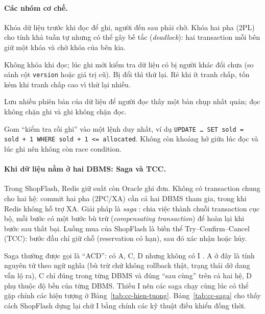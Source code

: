 \paragraph{Các nhóm cơ chế.}
\begin{description}[style=nextline, leftmargin=1.25cm]
  \item[Khóa bi quan.] Khóa dữ liệu trước khi đọc để ghi, người đến sau phải chờ. Khóa hai pha (2PL) cho tính khả tuần tự nhưng có thể gây bế tắc (\emph{deadlock}): hai transaction mỗi bên giữ một khóa và chờ khóa của bên kia.
  \item[Kiểm soát lạc quan.] Không khóa khi đọc; lúc ghi mới kiểm tra dữ liệu có bị người khác đổi chưa (so sánh cột \texttt{version} hoặc giá trị cũ). Bị đổi thì thử lại. Rẻ khi ít tranh chấp, tốn kém khi tranh chấp cao vì thử lại nhiều.
  \item[MVCC.] Lưu nhiều phiên bản của dữ liệu để người đọc thấy một bản chụp nhất quán; đọc không chặn ghi và ghi không chặn đọc.
  \item[Thao tác nguyên tử.] Gom ``kiểm tra rồi ghi'' vào một lệnh duy nhất, ví dụ \texttt{UPDATE \ldots{} SET sold = sold + 1 WHERE sold + 1 <= allocated}. Không còn khoảng hở giữa lúc đọc và lúc ghi nên không còn race condition.
\end{description}

\paragraph{Khi dữ liệu nằm ở hai DBMS: Saga và TCC.} Trong ShopFlash, Redis giữ suất còn Oracle ghi đơn. Không có transaction chung cho hai hệ: commit hai pha (2PC/XA) cần cả hai DBMS tham gia, trong khi Redis không hỗ trợ XA. Giải pháp là \emph{saga} \cite{cc-garcia1987}: chia việc thành chuỗi transaction cục bộ, mỗi bước có một bước bù trừ (\emph{compensating transaction}) để hoàn lại khi bước sau thất bại. Luồng mua của ShopFlash là biến thể Try--Confirm--Cancel (TCC): bước đầu chỉ giữ chỗ (reservation có hạn), sau đó xác nhận hoặc hủy.

Saga thường được gọi là ``ACD'': có A, C, D nhưng không có I \cite{cc-richardson2018}. A ở đây là tính nguyên tử theo ngữ nghĩa (bù trừ chứ không rollback thật, trạng thái dở dang vẫn lộ ra), C chỉ đúng trong từng DBMS và đúng ``sau cùng'' trên cả hai hệ, D phụ thuộc độ bền của từng DBMS. Thiếu I nên các saga chạy cùng lúc có thể gặp chính các hiện tượng ở Bảng~\ref{tab:cc-hien-tuong}. Bảng~\ref{tab:cc-saga} cho thấy cách ShopFlash dựng lại chữ I bằng chính các kỹ thuật điều khiển đồng thời.

